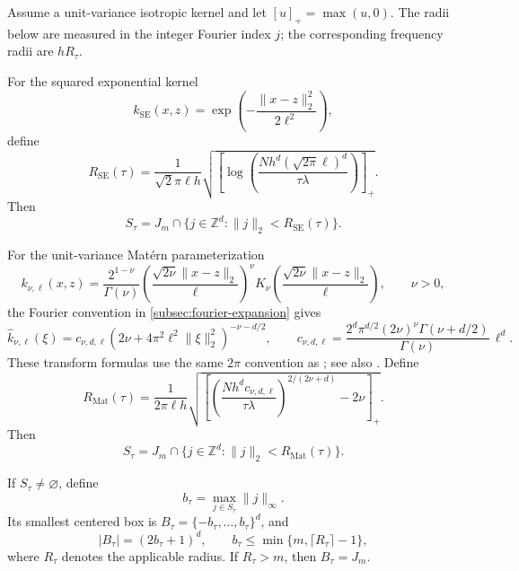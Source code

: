 \begin{proposition}
\label{prop:threshold-box-growth}
Assume a unit-variance isotropic kernel and let \([u]_+=\max(u,0)\).
The radii below are measured in the integer Fourier index \(j\); the
corresponding frequency radii are \(hR_\tau\).

For the squared exponential kernel
\[
    k_{\mathrm{SE}}(x,z)
    =\exp\!\left(-\frac{\|x-z\|_2^2}{2\ell^2}\right),
\]
define
\begin{equation}
    R_{\mathrm{SE}}(\tau)
    =\frac{1}{\sqrt{2}\pi\ell h}
    \sqrt{\left[
        \log\!\left(
            \frac{Nh^d(\sqrt{2\pi}\ell)^d}{\tau\lambda}
        \right)
    \right]_+}.
    \label{eq:se-active-radius}
\end{equation}
Then
\begin{equation}
    S_\tau
    =J_m\cap\{j\in\mathbb Z^d:\|j\|_2<R_{\mathrm{SE}}(\tau)\}.
    \label{eq:se-active-ball}
\end{equation}

For the unit-variance Mat\'ern parameterization
\[
    k_{\nu,\ell}(x,z)
    =\frac{2^{1-\nu}}{\Gamma(\nu)}
    \left(\frac{\sqrt{2\nu}\|x-z\|_2}{\ell}\right)^\nu
    K_\nu\!\left(\frac{\sqrt{2\nu}\|x-z\|_2}{\ell}\right),
    \qquad \nu>0,
\]
the Fourier convention in \cref{subsec:fourier-expansion} gives
\begin{equation}
    \widehat k_{\nu,\ell}(\xi)
    =c_{\nu,d,\ell}
    \left(2\nu+4\pi^2\ell^2\|\xi\|_2^2\right)^{-\nu-d/2},
    \qquad
    c_{\nu,d,\ell}
    =\frac{2^d\pi^{d/2}(2\nu)^\nu\Gamma(\nu+d/2)}
           {\Gamma(\nu)}\,\ell^d.
    \label{eq:matern-spectrum-active-box}
\end{equation}
These transform formulas use the same \(2\pi\) convention as
\cite[Sec.~4.2]{rasmussen2006gaussian}; see also
\cite{barnett2024uniform}. Define
\begin{equation}
    R_{\mathrm{Mat}}(\tau)
    =\frac{1}{2\pi\ell h}
    \sqrt{\left[
        \left(\frac{Nh^dc_{\nu,d,\ell}}{\tau\lambda}\right)^{2/(2\nu+d)}
        -2\nu
    \right]_+}.
    \label{eq:matern-active-radius}
\end{equation}
Then
\begin{equation}
    S_\tau
    =J_m\cap\{j\in\mathbb Z^d:\|j\|_2<R_{\mathrm{Mat}}(\tau)\}.
    \label{eq:matern-active-ball}
\end{equation}

If \(S_\tau\ne\varnothing\), define
\[
    b_\tau=\max_{j\in S_\tau}\|j\|_\infty.
\]
Its smallest centered box is
\(B_\tau=\{-b_\tau,\ldots,b_\tau\}^d\), and
\begin{equation}
    |B_\tau|=(2b_\tau+1)^d,
    \qquad
    b_\tau\leq
    \min\{m,\lceil R_\tau\rceil-1\},
    \label{eq:threshold-box-cardinality}
\end{equation}
where \(R_\tau\) denotes the applicable radius. If \(R_\tau>m\), then
\(B_\tau=J_m\).
\end{proposition}

